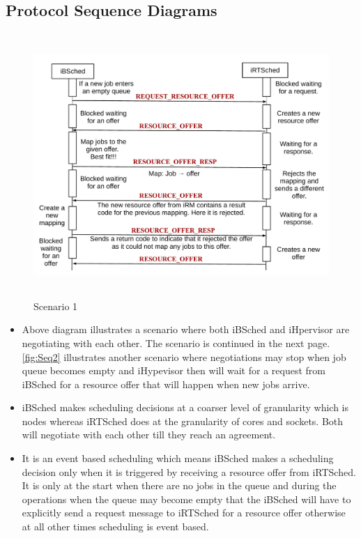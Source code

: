 \subsection{Protocol Sequence Diagrams}
\begin{figure}[!t]
\centering
\includegraphics[width=1.0\textwidth, height=100mm]{./figures/scenario1.pdf}
\caption{Scenario 1}
\label{fig:Seq1}
\end{figure}
\begin{itemize}
\item Above diagram illustrates a scenario where both iBSched and iHpervisor are negotiating with each other. The scenario is continued in the next page. \ref{fig:Seq2} illustrates another scenario where negotiations may stop when job queue becomes empty and iHypevisor then will wait for a request from iBSched for a resource offer that will happen when new jobs arrive.
\item iBSched makes scheduling decisions at a coarser level of granularity which is nodes whereas iRTSched does at the granularity of cores and sockets. Both will negotiate with each other till they reach an agreement.
\item It is an event based scheduling which means iBSched makes a scheduling decision only when it is triggered by receiving a resource offer from iRTSched. It is only at the start when there are no jobs in the queue and during the operations when the queue may become empty that the iBSched will have to explicitly send a request message to iRTSched for a resource offer otherwise at all other times scheduling is event based.
\end{itemize}
